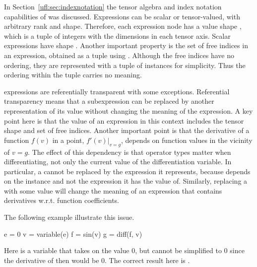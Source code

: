 
In Section~\ref{ufl:sec:indexnotation} the tensor algebra and index
notation capabilities of \ufl{} was discussed.  Expressions can be
scalar or tensor-valued, with arbitrary rank and shape. Therefore,
each expression node has a value shape , which is a
tuple of integers with the dimensions in each tensor axis. Scalar
expressions have shape \icode{()}. Another important property is the
set of free indices in an expression, obtained as a tuple using
.  Although the free indices have no
ordering, they are represented with a tuple of  instances
for simplicity. Thus the ordering within the tuple carries no meaning.

\ufl{} expressions are referentially transparent with some
exceptions. Referential transparency means that a subexpression can be
replaced by another representation of its value without changing the
meaning of the expression.  A key point here is that the value of an
expression in this context includes the tensor shape and set of free
indices.  Another important point is that the derivative of a function
$f(v)$ in a point, $f'(v)|_{v=g}$, depends on function values in the
vicinity of $v=g$.  The effect of this dependency is that operator
types matter when differentiating, not only the current value of the
differentiation variable.  In particular, a  cannot be
replaced by the expression it represents, because  depends
on the  instance and not the expression it has the
value of.  Similarly, replacing a  with some value
will change the meaning of an expression that contains derivatives
w.r.t. function coefficients.

The following example illustrate this issue.
\begin{python}
e = 0
v = variable(e)
f = sin(v)
g = diff(f, v)
\end{python}
Here  is a variable that takes on the value 0, but
 cannot be simplified to 0 since the derivative of
 then would be 0.  The correct result here is .

